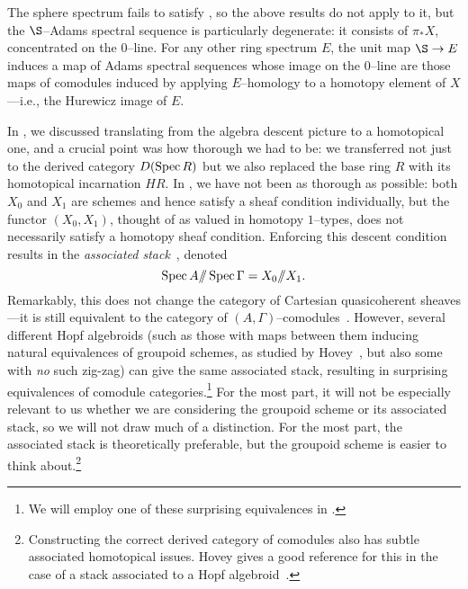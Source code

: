 \begin{remark}\label{HurewiczRemark}
The sphere spectrum fails to satisfy {\CH}, so the above results do not apply to it, but the $\S$--Adams spectral sequence is particularly degenerate: it consists of $\pi_* X$, concentrated on the $0$--line.  For any other ring spectrum $E$, the unit map $\S \to E$ induces a map of Adams spectral sequences whose image on the $0$--line are those maps of comodules induced by applying $E$--homology to a homotopy element of $X$---i.e., the Hurewicz image of $E$.
\end{remark}

\begin{remark}\label{WarningAboutStacks}
In , we discussed translating from the algebra descent picture to a homotopical one, and a crucial point was how thorough we had to be: we transferred not just to the derived category $D(\operatorname{Spec} R)$ but we also replaced the base ring $R$ with its homotopical incarnation $HR$.  In , we have not been as thorough as possible: both $X_0$ and $X_1$ are schemes and hence satisfy a sheaf condition individually, but the functor $(X_0, X_1)$, thought of as valued in homotopy $1$--types, does not necessarily satisfy a homotopy sheaf condition.  Enforcing this descent condition results in the \textit{associated stack}~\cite[Definition 8.13]{HopkinsCOCTALOS}, denoted \[\operatorname{Spec} A /\!\!/ \operatorname{Spec} \Gamma = X_0 /\!\!/ X_1.\]  Remarkably, this does not change the category of Cartesian quasicoherent sheaves---it is still equivalent to the category of $(A, \Gamma)$--comodules~\cite[Proposition 11.6]{HopkinsCOCTALOS}.  However, several different Hopf algebroids (such as those with maps between them inducing natural equivalences of groupoid schemes, as studied by Hovey~\cite[Theorem D]{HoveyMoritaThy}, but also some with \emph{no} such zig-zag) can give the same associated stack, resulting in surprising equivalences of comodule categories.\footnote{We will employ one of these surprising equivalences in .}  For the most part, it will not be especially relevant to us whether we are considering the groupoid scheme or its associated stack, so we will not draw much of a distinction.  For the most part, the associated stack is theoretically preferable, but the groupoid scheme is easier to think about.\footnote{Constructing the correct derived category of comodules also has subtle associated homotopical issues.  Hovey gives a good reference for this in the case of a stack associated to a Hopf algebroid~\cite{HoveyHomotopyOfComodules}.}
\end{remark}

